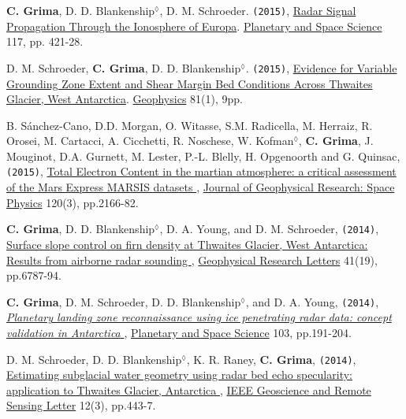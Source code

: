 \begin{etaremune}
\item
  \textbf{C. Grima}, D. D. Blankenship$^\lozenge$, D. M. Schroeder. \texttt{(2015)}, \href{http://www.sciencedirect.com/science/article/pii/S0032063315002470}{Radar Signal Propagation Through the Ionosphere of Europa}. \ul{Planetary and Space Science} 117, pp. 421-28.
  
\item
  D. M. Schroeder, \textbf{C. Grima}, D. D. Blankenship$^\lozenge$. \texttt{(2015)}, \href{http://library.seg.org/doi/abs/10.1190/geo2015-0122.1}{Evidence for Variable Grounding Zone Extent and Shear Margin Bed Conditions Across Thwaites Glacier, West Antarctica}. \ul{Geophysics} 81(1), 9pp.
  
\item
  B. Sánchez-Cano, D.D. Morgan, O. Witasse, S.M. Radicella, M. Herraiz, R. Orosei, M. Cartacci, A. Cicchetti, R. Noschese, W. Kofman$^\lozenge$, \textbf{C. Grima}, J. Mouginot, D.A. Gurnett, M. Lester, P.-L. Blelly, H. Opgenoorth and G. Quinsac, \texttt{(2015)}, \href{http://onlinelibrary.wiley.com/doi/10.1002/2014JA020630/abstract}{Total Electron Content in the martian atmosphere: a critical assessment of the Mars Express MARSIS datasets  \aiOpenAccessSquare}, \ul{Journal of Geophysical Research: Space Physics} 120(3), pp.2166-82.

\item
  \textbf{C. Grima}, D. D. Blankenship$^\lozenge$, D. A. Young, and D. M. Schroeder, \texttt{(2014)}, \href{http://onlinelibrary.wiley.com/enhanced/doi/10.1002/2014GL061635/}{Surface slope control on firn density at Thwaites Glacier, West Antarctica: Results from airborne radar sounding  \aiOpenAccessSquare}, \ul{Geophysical Research Letters} 41(19), pp.6787-94.

\item
  \textbf{C. Grima}, D. M. Schroeder, D. D. Blankenship$^\lozenge$, and D. A. Young, \texttt{(2014)}, \href{http://www.sciencedirect.com/science/article/pii/S0032063314002244}{\emph{Planetary landing zone reconnaissance using ice penetrating radar data: concept validation in Antarctica \aiOpenAccessSquare}}, \ul{Planetary and Space Science} 103, pp.191-204.

\item
  D. M. Schroeder, D. D. Blankenship$^\lozenge$, K. R. Raney, \textbf{C. Grima}, \texttt{(2014)},
  \href{http://ieeexplore.ieee.org/xpl/login.jsp?tp=\&arnumber=6901268\&url=http\%3A\%2F\%2Fieeexplore.ieee.org\%2Fstamp\%2Fstamp.jsp\%3Ftp\%3D\%26arnumber\%3D6901268}{Estimating subglacial water geometry using radar bed echo specularity: application to Thwaites Glacier, Antarctica \aiOpenAccessSquare}, \ul{IEEE Geoscience and Remote Sensing Letter} 12(3), pp.443-7.


\end{etaremune}
